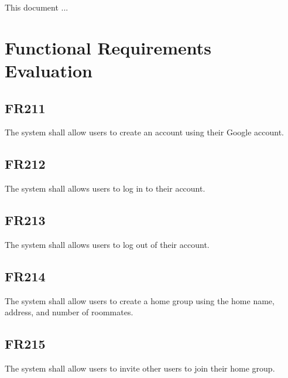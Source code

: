 \documentclass[12pt, titlepage]{article}
\begin{document}

This document ...

\section{Functional Requirements Evaluation}

\subsection{FR211}
The system shall allow users to create an account using their Google account.
\renewcommand{\arraystretch}{1.5}
\begin{center}
\end{center}
\subsection{FR212}
The system shall allows users to log in to their account.
\subsection{FR213}
The system shall allows users to log out of their account.
\subsection{FR214}
The system shall allow users to create a home group using the home name, address, and number of roommates.

\subsection{FR215}
The system shall allow users to invite other users to join their home group.
\end{document}
